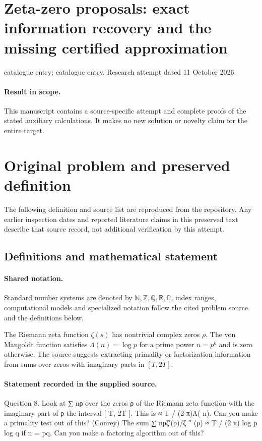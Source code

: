 \documentclass[11pt]{article}
\begin{document}
\section*{Zeta-zero proposals: exact information recovery and the missing certified approximation}
\noindent catalogue entry; catalogue entry. Research attempt dated 11 October 2026.
\paragraph{Result in scope.}This manuscript contains a source-specific attempt and complete proofs of the stated auxiliary calculations. It makes no new solution or novelty claim for the entire target.
\section{Original problem and preserved definition}
The following definition and source list are reproduced from the repository. Any earlier inspection dates and reported literature claims in this preserved text describe that source record, not additional verification by this attempt.
\subsection{Definitions and mathematical statement}

\paragraph{Shared notation.}Standard number systems are denoted by $\mathbb N,\mathbb Z,\mathbb Q,\mathbb R,\mathbb C$; index ranges, computational models and specialized notation follow the cited problem source and the definitions below.


The Riemann zeta function $\zeta(s)$ has nontrivial complex zeros $\rho$. The von Mangoldt function satisfies $\Lambda(n)=\log p$ for a prime power $n=p^k$ and is zero otherwise. The source suggests extracting primality or factorization information from sums over zeros with imaginary parts in $[T,2T]$.
\paragraph{Statement recorded in the supplied source.}
Question 8. Look at ∑ nρ over the zeros ρ of the Riemann zeta function with the imaginary part of ρ the interval [ T, 2T ]. This is ≈ T / (2 π)Λ( n). Can you make a primality test out of this? (Conrey) The sum ∑ nρζ′(ρ)/ζ ′′ (ρ) ≈ T / (2 π) log p log q if n = pq. Can you make a factoring algorithm out of this?
\end{document}
